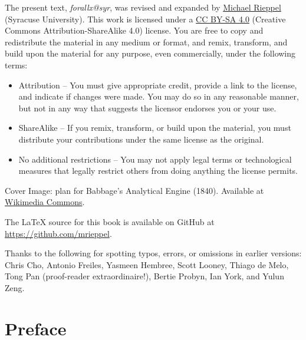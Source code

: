 \noindent The present text, \emph{forallx@syr}, was revised and expanded by \href{https://mrieppel.net/}{Michael Rieppel} (Syracuse University).  This work is licensed under a \href{https://creativecommons.org/licenses/by-sa/4.0/}{CC BY-SA 4.0} (Creative Commons Attribution-ShareAlike 4.0) license.  You are free to copy and redistribute the material in any medium or format, and  remix, transform, and build upon the material for any purpose, even commercially, under the following terms:
\begin{itemize}
\item Attribution -- You must give appropriate credit, provide a link to the license, and indicate if changes were made. You may do so in any reasonable manner, but not in any way that suggests the licensor endorses you or your use.

\item ShareAlike -- If you remix, transform, or build upon the material, you must distribute your contributions under the same license as the original.

\item No additional restrictions -- You may not apply legal terms or technological measures that legally restrict others from doing anything the license permits.
\end{itemize}

\vspace{1ex}
\noindent Cover Image: plan for Babbage's Analytical Engine (1840). Available at \href{https://commons.wikimedia.org/wiki/File:Babbage_Analytical_Engine_Plan_1840_CHM.agr.jpg}{Wikimedia Commons}.

\vspace{1ex}

\noindent The \LaTeX{} source for this book is available on GitHub at \href{https://github.com/mrieppel}{https://github.com/mrieppel}. 

\vspace{1ex}
\noindent Thanks to the following for spotting typos, errors, or omissions in earlier versions: Chris Cho, Antonio Freiles, Yasmeen Hembree, Scott Looney, Thiago de Melo, Tong Pan (proof-reader extraordinaire!), Bertie Probyn, Ian York, and Yulun Zeng.

\vspace{4ex}



\newpage
\normalsize
\chapter*{Preface}

